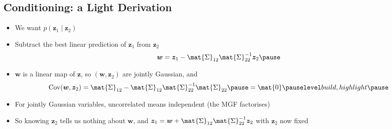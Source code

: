 
\begin{slide}
\section[-2]{Conditioning: a Light Derivation}

\begin{PauseHighLight}\squeeze
  \begin{itemize}
  \item We want $p(\bm{z}_1\mid\bm{z}_2)$\pause
  \item Subtract the best linear prediction of $\bm{z}_1$ from $\bm{z}_2$
    \begin{align*}
      \bm{w} = \bm{z}_1 - \mat{\Sigma}_{12}\mat{\Sigma}_{22}^{-1}\bm{z}_2\pause
    \end{align*}
  \item $\bm{w}$ is a linear map of $\bm{z}$, so $(\bm{w},\bm{z}_2)$ are
    jointly Gaussian, and
    \begin{align*}
      \mathrm{Cov}(\bm{w},\bm{z}_2) = \mat{\Sigma}_{12} -
      \mat{\Sigma}_{12}\mat{\Sigma}_{22}^{-1}\mat{\Sigma}_{22}\pause = \mat{0}\pauseb
    \end{align*}
  \item For jointly Gaussian variables, uncorrelated means
    independent\pause{} (the MGF factorises)\pause
  \item So knowing $\bm{z}_2$ tells us nothing about $\bm{w}$, and
    $\bm{z}_1 = \bm{w} + \mat{\Sigma}_{12}\mat{\Sigma}_{22}^{-1}\bm{z}_2$
    with $\bm{z}_2$ now fixed\pause
  \end{itemize}
\end{PauseHighLight}

\end{slide}



